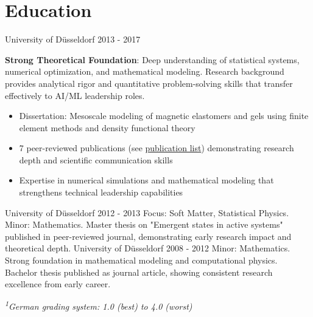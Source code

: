 \documentclass[singlesided,
               paper=a4,
               fontsize=10pt
              ]{my-resume}
\begin{document}
\section[\faMortarBoard]{Education}
    {University of Düsseldorf}
    {2013 - 2017}
    {
        \textbf{Strong Theoretical Foundation}: Deep understanding of statistical systems, numerical optimization, and mathematical modeling. Research background provides analytical rigor and quantitative problem-solving skills that transfer effectively to AI/ML leadership roles.
        \begin{itemize}[leftmargin=2em]
            \item Dissertation: Mesoscale modeling of magnetic elastomers and gels using finite element methods and density functional theory
            \item 7 peer-reviewed publications (see \href{https://scholar.google.com/citations?hl=de&user=MnU8ZxwAAAAJ}{publication list}) demonstrating research depth and scientific communication skills
            \item Expertise in numerical simulations and mathematical modeling that strengthens technical leadership capabilities
        \end{itemize}
    }
%
    {University of Düsseldorf}
    {2012 - 2013}
    {
        Focus: Soft Matter, Statistical Physics. Minor: Mathematics. Master thesis on "Emergent states in active systems" published in peer-reviewed journal, demonstrating early research impact and theoretical depth.
    }
%
    {University of Düsseldorf}
    {2008 - 2012}
    {
        Minor: Mathematics. Strong foundation in mathematical modeling and computational physics. Bachelor thesis published as journal article, showing consistent research excellence from early career.
    }

\vspace{0.5em}
\textit{\small \textsuperscript{1}German grading system: 1.0 (best) to 4.0 (worst)}
\end{document}
